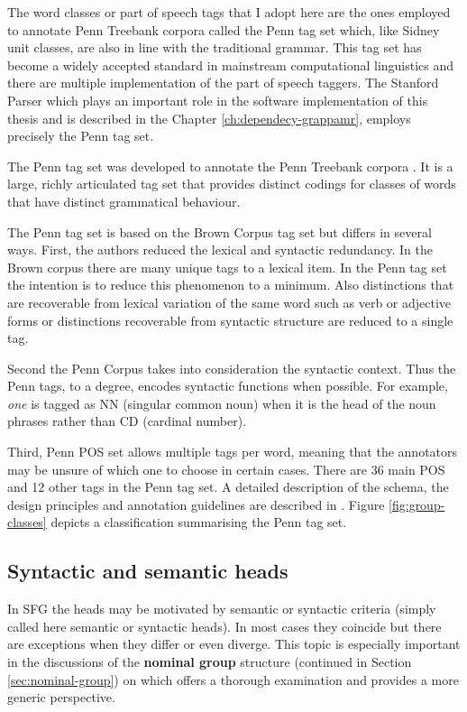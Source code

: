 The word classes or part of speech tags that I adopt here are the ones employed to annotate Penn Treebank corpora called the Penn tag set \citep{Marcus1993} which, like Sidney unit classes, are also in line with the traditional grammar. This tag set has become a widely accepted standard in mainstream computational linguistics and there are multiple implementation of the part of speech taggers. The Stanford Parser which plays an important role in the software implementation of this thesis and is described in the Chapter \ref{ch:dependecy-grappamr}, employs precisely the Penn tag set.

The Penn tag set was developed to annotate the Penn Treebank corpora \citep{Marcus1993}. It is a large, richly articulated tag set that provides distinct codings for classes of words that have distinct grammatical behaviour.

The Penn tag set is based on the Brown Corpus tag set \citep{Kucera1968} but differs in several ways. First, the authors reduced the lexical and syntactic redundancy. In the Brown corpus there are many unique tags to a lexical item. In the Penn tag set the intention is to reduce this phenomenon to a minimum. Also distinctions that are recoverable from lexical variation of the same word such as verb or adjective forms or distinctions recoverable from syntactic structure are reduced to a single tag. 

Second the Penn Corpus takes into consideration the syntactic context. Thus the Penn tags, to a degree, encodes syntactic functions when possible. For example, \textit{one} is tagged as NN (singular common noun) when it is the head of the noun phrases rather than CD (cardinal number). 

Third, Penn POS set allows multiple tags per word, meaning that the annotators may be unsure of which one to choose in certain cases. There are 36 main POS and 12 other tags in the Penn tag set. A detailed description of the schema, the design principles and annotation guidelines are described in \citep{Santorini1990}. Figure \ref{fig:group-classes} depicts a classification summarising the Penn tag set. 



\subsection{Syntactic and semantic heads}
\label{sec:heads}
In SFG the heads may be motivated by semantic or syntactic criteria (simply called here semantic or syntactic heads). In most cases they coincide but there are exceptions when they differ or even diverge. This topic is especially important in the discussions of the \textbf{nominal group} structure (continued in Section \ref{sec:nominal-group}) on which \citet{Halliday2013} offers a thorough examination and \citet{Fawcett2000} provides a more generic perspective.


